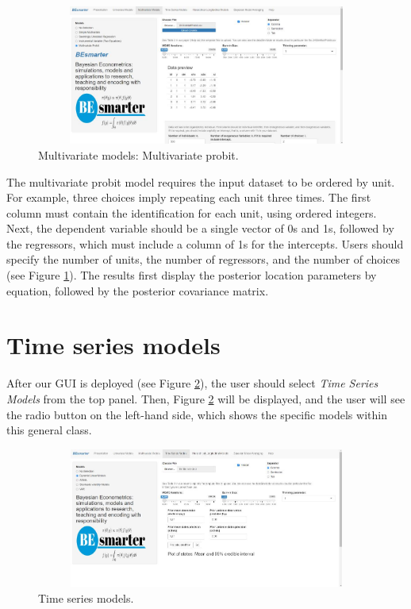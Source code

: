 \begin{figure}
	\includegraphics[width=340pt, height=130pt]{Chapters/chapterGUI/figures/Figure7.jpg}
	\caption[List of figure caption goes here]{Multivariate models: Multivariate probit.}\label{fig67}
\end{figure} 

The multivariate probit model requires the input dataset to be ordered by unit. For example, three choices imply repeating each unit three times. The first column must contain the identification for each unit, using ordered integers. Next, the dependent variable should be a single vector of 0s and 1s, followed by the regressors, which must include a column of 1s for the intercepts. Users should specify the number of units, the number of regressors, and the number of choices (see Figure \ref{fig67}). The results first display the posterior location parameters by equation, followed by the posterior covariance matrix.

\section{Time series models}\label{secGUI4}
After our GUI is deployed (see Figure \ref{fig8a}), the user should select \textit{Time Series Models} from the top panel. Then, Figure \ref{fig8a} will be displayed, and the user will see the radio button on the left-hand side, which shows the specific models within this general class.

\begin{figure}
	\includegraphics[width=340pt, height=130pt]{Chapters/chapterGUI/figures/Figure8a.jpg}
	\caption[List of figure caption goes here]{Time series models.}\label{fig8a}
\end{figure} 

